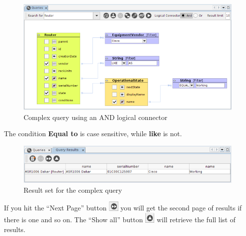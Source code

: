 \documentclass[a4paper]{article}
\begin{document}
	\begin{figure}[h!]
		\centering
		\includegraphics[width=1.1\linewidth]{img/query_example_2.png}
		\caption{Complex query using an AND logical connector}
		\label{fig:query_example_2}
	\end{figure}
	
	The condition \textbf{Equal to} is case sensitive, while \textbf{like} is not.
	\begin{figure}[h!]
		\centering
		\includegraphics[width=1.1\linewidth]{img/query_example_2_results.png}
		\caption{Result set for the complex query}
		\label{fig:query_example_2_results}
	\end{figure}
	If you hit the “Next Page” button \includegraphics[width=0.5cm]{img/icon_next_page.png} you will get the second page of results if there is one and so on. The “Show all” button \includegraphics[width=0.5cm]{img/icon_retrieve_all.png} will retrieve the full list of results.
	
\end{document}
